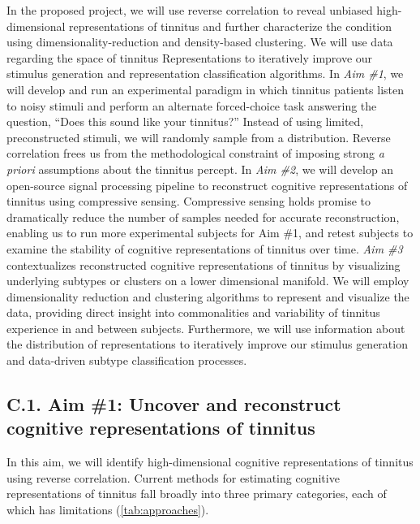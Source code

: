 \documentclass[11pt, notitlepage]{article} %
\begin{document}
In the proposed project, we will use reverse correlation to reveal unbiased high-dimensional
representations of tinnitus and further characterize the condition
using dimensionality-reduction and density-based clustering.
We will use data regarding the space of tinnitus Representations
to iteratively improve our stimulus generation and representation classification algorithms.
In \emph{Aim \#1}, we will develop and run an experimental paradigm
in which tinnitus patients listen to noisy stimuli and perform an alternate forced-choice task
answering the question, ``Does this sound like your tinnitus?''
Instead of using limited, preconstructed stimuli, we will randomly sample from a distribution.
Reverse correlation frees us from the methodological constraint of imposing strong \emph{a priori}
assumptions about the tinnitus percept.
In \emph{Aim \#2}, we will develop an open-source signal processing pipeline
to reconstruct cognitive representations of tinnitus using compressive sensing.
Compressive sensing holds promise to dramatically reduce the number of samples
needed for accurate reconstruction, enabling us to run more experimental subjects for Aim \#1,
and retest subjects to examine the stability of cognitive representations of tinnitus over time.
\emph{Aim \#3} contextualizes reconstructed cognitive representations of tinnitus
by visualizing underlying subtypes or clusters on a lower dimensional manifold.
We will employ dimensionality reduction and clustering algorithms to represent and visualize the data,
providing direct insight into commonalities and variability of tinnitus experience in and between subjects.
Furthermore, we will use information about the distribution of representations
to iteratively improve our stimulus generation and data-driven subtype classification processes.


\subsection*{C.1. Aim \#1: Uncover and reconstruct cognitive representations of tinnitus}

In this aim, we will identify high-dimensional cognitive representations of tinnitus using reverse correlation.
Current methods for estimating cognitive representations of tinnitus fall broadly into three primary categories,
each of which has limitations (\autoref{tab:approaches}).
\end{document}
